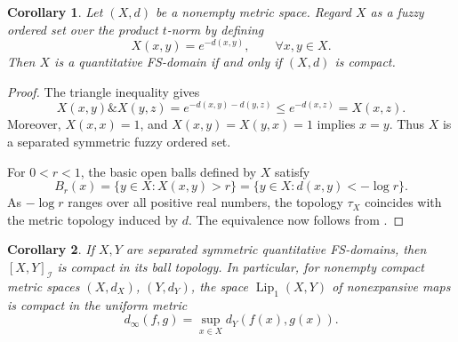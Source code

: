 \documentclass[preprint,3p,times]{elsarticle}
\newtheorem{corollary}[corollary]{Corollary}
\theoremstyle{definition}
\theoremstyle{remark}
\newcommand{\I}{\mathcal{I}}
\newcommand{\tn}{\mathbin{\&}}
\numberwithin{equation}{section}
\begin{document}





\begin{corollary}\label{cor:complete-metric}
Let \((X,d)\) be a nonempty metric space. Regard \(X\) as a fuzzy ordered set over the product \(t\)-norm by defining
\[
X(x,y)=e^{-d(x,y)}
,\qquad \forall x,y\in X.
\]
Then \(X\) is a quantitative FS-domain if and only if
\((X,d)\) is compact.
\end{corollary}

\begin{proof}
The triangle inequality gives
\[
X(x,y)\tn X(y,z)
=e^{-d(x,y)-d(y,z)}
\leq e^{-d(x,z)}
=X(x,z).
\]
Moreover, \(X(x,x)=1\), and \(X(x,y)=X(y,x)=1\) implies \(x=y\). Thus \(X\) is a separated symmetric fuzzy ordered set.

For \(0<r<1\), the basic open balls defined by \(X\) satisfy
\[
B_r(x)
=\{y\in X:X(x,y)>r\}
=\{y\in X:d(x,y)<-\log r\}.
\]
As \(-\log r\) ranges over all positive real numbers,
the topology \(\tau_X\) coincides with the metric topology
induced by \(d\). The equivalence now follows from
.
\end{proof}

\begin{corollary}\label{cor:compact-function-space}
If \(X,Y\) are separated symmetric quantitative FS-domains, then \([X,Y]_{\I}\) is compact in its ball topology. In particular, for nonempty compact metric spaces \((X,d_X)\), \((Y,d_Y)\), the space \(\operatorname{Lip}_1(X,Y)\) of nonexpansive maps is compact in the uniform metric
\[
 d_\infty(f,g)=\sup_{x\in X}d_Y(f(x),g(x)).
\]
\end{corollary}
\end{document}
